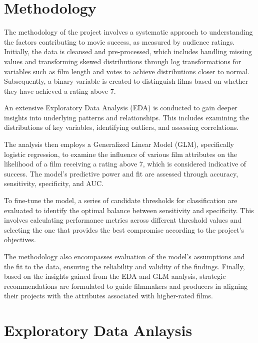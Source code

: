 \documentclass[
  11pt,
]{article}
\begin{document}
\hypertarget{methodology}{%
\section{Methodology}\label{methodology}}

The methodology of the project involves a systematic approach to
understanding the factors contributing to movie success, as measured by
audience ratings. Initially, the data is cleansed and pre-processed,
which includes handling missing values and transforming skewed
distributions through log transformations for variables such as film
length and votes to achieve distributions closer to normal.
Subsequently, a binary variable is created to distinguish films based on
whether they have achieved a rating above 7.

An extensive Exploratory Data Analysis (EDA) is conducted to gain deeper
insights into underlying patterns and relationships. This includes
examining the distributions of key variables, identifying outliers, and
assessing correlations.

The analysis then employs a Generalized Linear Model (GLM), specifically
logistic regression, to examine the influence of various film attributes
on the likelihood of a film receiving a rating above 7, which is
considered indicative of success. The model's predictive power and fit
are assessed through accuracy, sensitivity, specificity, and AUC.

To fine-tune the model, a series of candidate thresholds for
classification are evaluated to identify the optimal balance between
sensitivity and specificity. This involves calculating performance
metrics across different threshold values and selecting the one that
provides the best compromise according to the project's objectives.

The methodology also encompasses evaluation of the model's assumptions
and the fit to the data, ensuring the reliability and validity of the
findings. Finally, based on the insights gained from the EDA and GLM
analysis, strategic recommendations are formulated to guide filmmakers
and producers in aligning their projects with the attributes associated
with higher-rated films.

\hypertarget{exploratory-data-anlaysis}{%
\section{Exploratory Data Anlaysis}\label{exploratory-data-anlaysis}}
\end{document}
